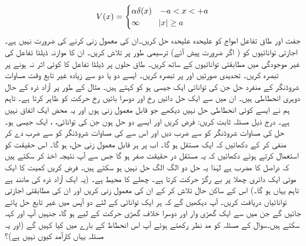 \begin{align*}
V(x)=
\begin{cases}
\alpha\delta (x)& -a< x< +a\\
\infty &\abs{x}\ge a
\end{cases}
 \end{align*} 
 جفت اور طاق تفاعل امواج کو علیحدہ علیحدہ حل کریں۔ان کی معمول زنی کرنے کی ضرورت نہیں ہے۔ اجازتی توانائیوں کو ( اگر ضرورت پیش آئے) ترسیمی طور پر تلاش کریں۔ ان کا موازنہ ڈیلٹا تفاعل کی غیر موجودگی میں مطابقتی توانائیوں کے ساتھ کریں۔ طاق حلوں پر ڈیلٹا تفاعل کا کوئی اثر نہ ہونے پر تبصرہ کریں۔ تحدیدی صورتیں  اور پر تبصرہ کریں۔ 
 ایسے دو یا دو سے زیادہ غیر تابع وقت مساوات شروڈنگر کے منفرد حل جن کی توانائی  ایک جیسی ہو کو  کہتے ہیں۔ مثال کے طور پر آزاد ذرہ کے حال دوہری انحطاطی ہیں۔ ان میں سے ایک حل دائیں رخ اور دوسرا بائیں رخ حرکت کو ظاہر کرتا ہے۔ تاہم ہم نے ایسے کوئی انحطاطی حل نہیں دیکھے جو قابل معمول زنی ہوں اور یہ محض ایک اتفاق نہیں ہے۔ 
 درج ذیل مسئلہ ثابت کریں: 
 فرض کریں
 اور  ایسے دو حل ہوں جن کی توانائی، ، ایک جیسی ہو۔ حل  کی مساوات شروڈنگر کو  سے ضرب دیں اور اس سے کی مساوات شروڈنگر کو  سے ضرب دے کر منفی کر کے دکھائیں کہ  ایک مستقل ہو گا۔
 اب  پر ہر قابل معمول زنی حل،  ہو گا۔ اس حقیقت کو استعمال کرتے ہوئے دکھائیں کہ یہ مستقل در حقیقت صفر ہو گا جس سے آپ نتیجہ اخذ کر سکتے ہیں کہ  دراصل  کا مضرب ہے لہٰذا یہ حل دو الگ الگ حل نہیں ہو سکتے ہیں۔
فرض کریں کمیت  کا ایک موتی ایک دائری چھلا پر بے رگڑ حرکت کرتا ہے۔ چھلے کا محیط  ہے۔ (یہ ایک آزاد ذرہ کی مانند ہے تاہم یہاں ہو گا۔) اس کے ساکن حال تلاش کر کے ان کی معمول زنی کریں اور ان کی مطابقتی اجازتی توانائیاں دریافت کریں۔ آپ دیکھیں گے کہ ہر ایک توانائی کے لئے دو آپس میں غیر تابع حل پائے جائیں گے جن میں سے ایک گھڑی وار اور دوسرا خلاف گھڑی حرکت کے لیے ہو گا، جنہیں آپ اور  کہہ سکتے ہیں۔سوال  کے مسئلہ کو مد نظر رکھتے ہوئے آپ اس انحطاط کے بارے میں کیا کہیں گے (اور یہ مسئلہ یہاں کارآمد کیوں نہیں ہے)؟ 

